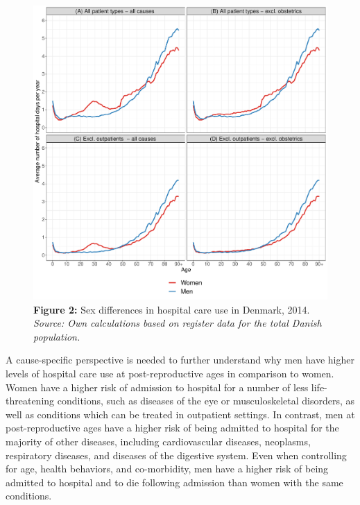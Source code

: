 	\begin{figure}[H]
		\centering
		\includegraphics[scale=0.425]{Summary/PLOT/HEALTHCARE_ANALYSIS/HOSP_Patterns.pdf}
		\caption*{\textbf{Figure 2:}    Sex differences in hospital care use in Denmark, 2014.
										\textit{Source: Own calculations based on register data 
										for the total Danish population.} 
										}
	\label{ch1:fig2} 	
	\end{figure}


A cause-specific perspective is needed to further understand 
why men have higher levels of hospital care use at post-reproductive 
ages in comparison to women. Women have a higher risk of admission 
to hospital for a number of less life-threatening conditions, 
such as diseases of the eye or musculoskeletal disorders,\citep{simmonds2014understanding,
westergaard2019population,rollman2001sex} as well as conditions 
which can be treated in outpatient settings.\citep{jensen2014temporal}  
In contrast, men at post-reproductive ages have a higher risk of 
being admitted to hospital for the majority of other diseases, 
including cardiovascular diseases, neoplasms, respiratory diseases, 
and diseases of the digestive system.\citep{simmonds2014understanding,
westergaard2019population} Even when controlling for age, health 
behaviors, and co-morbidity, men have a higher risk of being admitted 
to hospital and to die following admission than women with the same 
conditions.\citep{case2005sex} 

